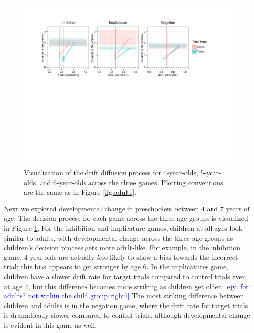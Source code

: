 \documentclass[10pt,letterpaper]{article}
\newcommand{\ejy}[1]{\textcolor{Blue}{[ejy: #1]}}  %
\begin{document}
\begin{figure}
\begin{center} 
\includegraphics[width=6in]{figures/child_vis.pdf}
\caption{\label{fig:kids} Visualization of the drift diffusion process for 4-year-olds, 5-year-olds, and 6-year-olds across the three games.  Plotting conventions are the same as in Figure \ref{fig:adults}.}
\end{center} 
\end{figure}

Next we explored developmental change in preschoolers between 4 and 7 years of age.  The decision process for each game across the three age groups is visualized in Figure \ref{fig:kids}.  For the inhibition and implicature games, children at all ages look similar to adults, with developmental change across the three age groups as children's decision process gets more adult-like.  For example, in the inhibition game, 4-year-olds are actually \emph{less} likely to show a bias towards the incorrect trial; this bias appears to get stronger by age 6.  In the implicatures game, children have a slower drift rate for target trials compared to control trials even at age 4, but this difference becomes more striking as children get older. \ejy{for adults? not within the child group right?} The most striking difference between children and adults is in the negation game, where the drift rate for target trials is dramatically slower compared to control trials, although developmental change is evident in this game as well.  
\end{document}
